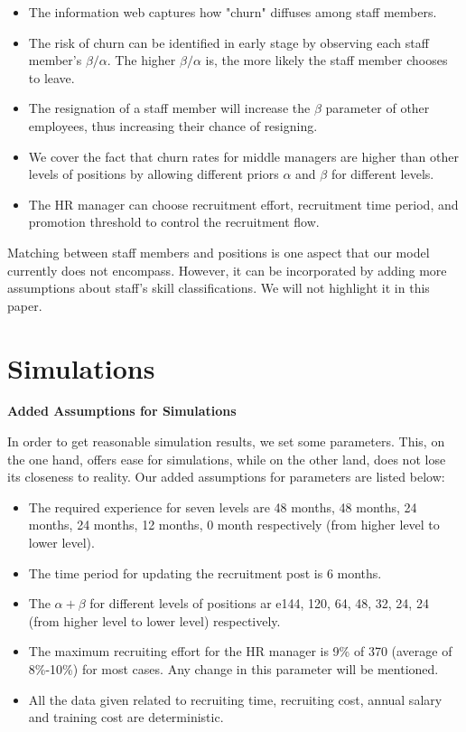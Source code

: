\documentclass[tcn = 37075, sheet = false, abstract = false]{mcmthesis}
\begin{document}
\begin{itemize}
\item The information web captures how "churn" diffuses among staff members.
\item The risk of churn can be identified in early stage by observing each staff member's $\beta/\alpha$. The higher $\beta/\alpha$ is, the more likely the staff member chooses to leave.
\item The resignation of a staff member will increase the $\beta$ parameter of other employees, thus increasing their chance of resigning.
\item We cover the fact that churn rates for middle managers are higher than other levels of positions by allowing different priors $\alpha$ and $\beta$ for different levels.
\item The HR manager can choose recruitment effort, recruitment time period, and promotion threshold to control the recruitment flow.
\end{itemize}

Matching between staff members and positions is one aspect that our model currently does not encompass. However, it can be incorporated by adding more assumptions about staff's skill classifications. We will not highlight it in this paper.


\section{Simulations}

\textbf{Added Assumptions for Simulations}

In order to get reasonable simulation results, we set some parameters. This, on the one hand, offers ease for simulations, while on the other land, does not lose its closeness to reality. Our added assumptions for parameters are listed below:
\begin{itemize}
\item The required experience for seven levels are 48 months, 48 months, 24 months, 24 months, 12 months, 0 month respectively (from higher level to lower level).
\item The time period for updating the recruitment post is 6 months.
\item The $\alpha + \beta$ for different levels of positions ar e144, 120, 64, 48, 32, 24, 24 (from higher level to lower level) respectively.
\item The maximum recruiting effort for the HR manager is 9\% of 370 (average of 8\%-10\%) for most cases. Any change in this parameter will be mentioned.
\item All the data given related to recruiting time, recruiting cost, annual salary and training cost are deterministic.
\end{itemize}
\end{document}
